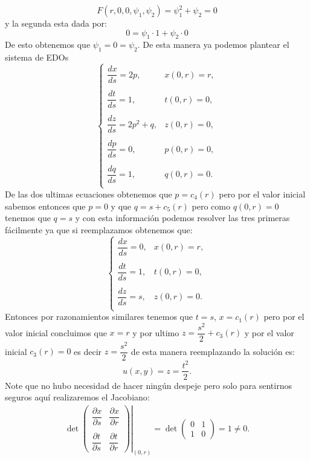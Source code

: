 \begin{homeworkProblem}
\begin{itemize}
\begin{solucion}
        $$F(r,0,0,\psi_1,\psi_2)=\psi_1^2+\psi_2=0$$
        y la segunda esta dada por:
        $$0=\psi_1\cdot1+\psi_2\cdot0$$
        De esto obtenemos que $\psi_1=0=\psi_2$. De esta manera ya podemos plantear el sistema de EDOs
        $$\begin{cases}
           \dfrac{dx}{ds}=2p,&x(0,r)=r,\\
           \\
            \dfrac{dt}{ds}=1,&t(0,r)=0,\\
            \\
            \dfrac{dz}{ds}=2p^2+q,&z(0,r)=0,\\
            \\
            \dfrac{dp}{ds}=0,&p(0,r)=0,\\
            \\
            \dfrac{dq}{ds}=1,&q(0,r)=0.\\
        \end{cases}$$
        De las dos ultimas ecuaciones obtenemos que $p=c_4(r)$ pero por el valor inicial sabemos entonces que $p=0$ y que $q=s+c_5(r)$ pero como $q(0,r)=0$ tenemos que $q=s$ y con esta información podemos resolver las tres primeras fácilmente ya que si reemplazamos obtenemos que:
        $$\begin{cases}
           \dfrac{dx}{ds}=0,&x(0,r)=r,\\
           \\
            \dfrac{dt}{ds}=1,&t(0,r)=0,\\
            \\
            \dfrac{dz}{ds}=s,&z(0,r)=0.\\
        \end{cases}$$
        Entonces por razonamientos similares tenemos que $t=s$, $x=c_1(r)$ pero por el valor inicial concluimos que $x=r$ y por ultimo $z=\dfrac{s^2}{2}+c_3(r)$ y por el valor inicial $c_3(r)=0$ es decir $z=\dfrac{s^2}{2}$ de esta manera reemplazando la solución es:
        $$u(x,y)=z=\dfrac{t^2}{2}.$$
        Note que no hubo necesidad de hacer ningún despeje pero solo para sentirnos seguros aquí realizaremos el Jacobiano:
        \begin{align*}
            \left.\det\begin{pmatrix}
                \dfrac{\partial x}{\partial s} & \dfrac{\partial x}{\partial r}\\
            & \\
            \dfrac{\partial t}{\partial s} & \dfrac{\partial t}{\partial r}
            \end{pmatrix}\right|_{(0,r)}=\det\begin{pmatrix}
                0 & 1\\
                1 & 0
            \end{pmatrix}=1\neq 0.
        \end{align*}
    \end{solucion}
\end{itemize}
\end{homeworkProblem}
\newpage

